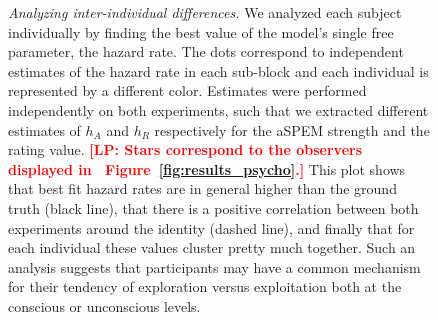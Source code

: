 \documentclass[12pt,english]{article}%
\newcommand{\seeFig}[1]{Figure~\ref{fig:#1}}
\newcommand{\LP}[1]{\textbf{\textcolor{red}{[LP: #1]}}}
\begin{document}
\begin{figure}%
\caption{\emph{Analyzing inter-individual differences.} %
We analyzed each subject individually by finding
the best value of the model's single free parameter, the hazard rate.
The dots correspond to independent estimates of the hazard rate in each sub-block and
each individual is represented by a different color.
Estimates were performed independently on both experiments,
such that we extracted different estimates of $h_A$ and $h_R$
respectively for the aSPEM strength and the rating value. 
\LP{Stars correspond to the observers displayed in ~\seeFig{results_psycho}.}
This plot shows that best fit hazard rates are in general higher than the ground truth (black line),
that there is a positive correlation between both experiments around the identity (dashed line),
and finally that for each individual these values cluster pretty much together.
Such an analysis suggests that participants may have
a common mechanism for their tendency of exploration versus exploitation
both at the conscious or unconscious levels.
}
\label{fig:results_inter}
\end{figure}
\end{document}
